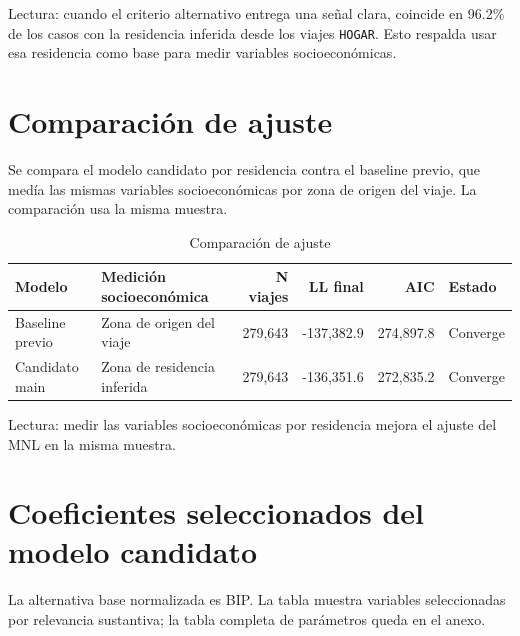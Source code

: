 \documentclass[11pt,letterpaper]{article}
\begin{document}
Lectura: cuando el criterio alternativo entrega una señal clara, coincide en 96.2\% de los casos con la residencia inferida desde los viajes \texttt{HOGAR}. Esto respalda usar esa residencia como base para medir variables socioeconómicas.

\section{Comparación de ajuste}

Se compara el modelo candidato por residencia contra el baseline previo, que medía las mismas variables socioeconómicas por zona de origen del viaje. La comparación usa la misma muestra.

\begin{table}[htbp]
\centering
\caption{Comparación de ajuste}
\small
\setlength{\tabcolsep}{4pt}
\begin{tabularx}{\textwidth}{l >{\raggedright\arraybackslash}X r r r l}
\toprule
Modelo & Medición socioeconómica & N viajes & LL final & AIC & Estado \\
\midrule
Baseline previo & Zona de origen del viaje & 279,643 & -137,382.9 & 274,897.8 & Converge \\
Candidato main & Zona de residencia inferida & 279,643 & -136,351.6 & 272,835.2 & Converge \\
\bottomrule
\end{tabularx}
\end{table}

Lectura: medir las variables socioeconómicas por residencia mejora el ajuste del MNL en la misma muestra.

\section{Coeficientes seleccionados del modelo candidato}

La alternativa base normalizada es BIP. La tabla muestra variables seleccionadas por relevancia sustantiva; la tabla completa de parámetros queda en el anexo.
\end{document}
